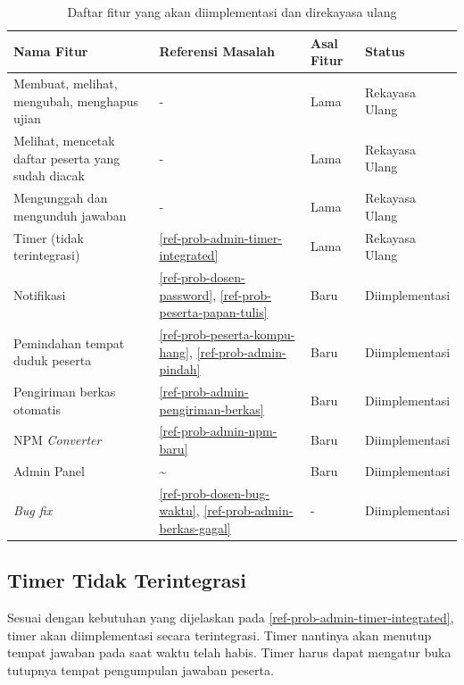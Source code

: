     \begin{table}[H]
        \centering
        \begin{tabular}{|p{4.5cm}|l|l|l|}
        \hline
        Nama Fitur & Referensi Masalah & Asal Fitur & Status\\
        \hline
        Membuat, melihat, mengubah, menghapus ujian & - & Lama & Rekayasa Ulang \\
        \hline
        Melihat, mencetak daftar peserta yang sudah diacak & - & Lama & Rekayasa Ulang \\
        \hline
        Mengunggah dan mengunduh jawaban & - & Lama & Rekayasa Ulang \\
        \hline
        Timer (tidak terintegrasi)  & \ref{ref-prob-admin-timer-integrated} & Lama & Rekayasa Ulang \\
        \hline
        Notifikasi & \ref{ref-prob-dosen-password}, \ref{ref-prob-peserta-papan-tulis} & Baru & Diimplementasi \\
        \hline
        Pemindahan tempat duduk peserta & \ref{ref-prob-peserta-kompu-hang}, \ref{ref-prob-admin-pindah} & Baru & Diimplementasi \\
        \hline
        Pengiriman berkas otomatis & \ref{ref-prob-admin-pengiriman-berkas} & Baru & Diimplementasi \\
        \hline
        NPM \textit{Converter} & \ref{ref-prob-admin-npm-baru} & Baru & Diimplementasi \\
        \hline
        Admin Panel & \~{} & Baru & Diimplementasi \\
        \hline
        \textit{Bug fix} & \ref{ref-prob-dosen-bug-waktu}, \ref{ref-prob-admin-berkas-gagal}  & - & Diimplementasi \\
        \hline
        \end{tabular}
        \caption{Daftar fitur yang akan diimplementasi dan direkayasa ulang}
        \label{tab:table-daftar-fitur}
    \end{table}
    
    \subsection{Timer Tidak Terintegrasi}
        Sesuai dengan kebutuhan yang dijelaskan pada \ref{ref-prob-admin-timer-integrated}, timer akan diimplementasi secara terintegrasi. Timer nantinya akan menutup tempat jawaban pada saat waktu telah habis. Timer harus dapat mengatur buka tutupnya tempat pengumpulan jawaban peserta.
    

